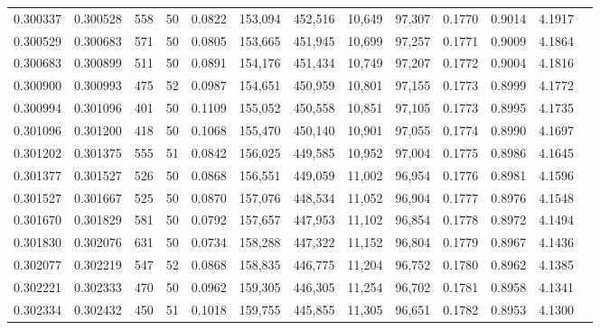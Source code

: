 \begin{tabular}{rrrrrrrrrrrrr}
0.300337 & 0.300528 &   558 &  50 &                                     0.0822 & 153,094 & 452,516 &  10,649 &  97,307 & 0.1770 & 0.9014 & 4.1917 \\
0.300529 & 0.300683 &   571 &  50 &                                     0.0805 & 153,665 & 451,945 &  10,699 &  97,257 & 0.1771 & 0.9009 & 4.1864 \\
0.300683 & 0.300899 &   511 &  50 &                                     0.0891 & 154,176 & 451,434 &  10,749 &  97,207 & 0.1772 & 0.9004 & 4.1816 \\
0.300900 & 0.300993 &   475 &  52 &                                     0.0987 & 154,651 & 450,959 &  10,801 &  97,155 & 0.1773 & 0.8999 & 4.1772 \\
0.300994 & 0.301096 &   401 &  50 &                                     0.1109 & 155,052 & 450,558 &  10,851 &  97,105 & 0.1773 & 0.8995 & 4.1735 \\
0.301096 & 0.301200 &   418 &  50 &                                     0.1068 & 155,470 & 450,140 &  10,901 &  97,055 & 0.1774 & 0.8990 & 4.1697 \\
0.301202 & 0.301375 &   555 &  51 &                                     0.0842 & 156,025 & 449,585 &  10,952 &  97,004 & 0.1775 & 0.8986 & 4.1645 \\
0.301377 & 0.301527 &   526 &  50 &                                     0.0868 & 156,551 & 449,059 &  11,002 &  96,954 & 0.1776 & 0.8981 & 4.1596 \\
0.301527 & 0.301667 &   525 &  50 &                                     0.0870 & 157,076 & 448,534 &  11,052 &  96,904 & 0.1777 & 0.8976 & 4.1548 \\
0.301670 & 0.301829 &   581 &  50 &                                     0.0792 & 157,657 & 447,953 &  11,102 &  96,854 & 0.1778 & 0.8972 & 4.1494 \\
0.301830 & 0.302076 &   631 &  50 &                                     0.0734 & 158,288 & 447,322 &  11,152 &  96,804 & 0.1779 & 0.8967 & 4.1436 \\
0.302077 & 0.302219 &   547 &  52 &                                     0.0868 & 158,835 & 446,775 &  11,204 &  96,752 & 0.1780 & 0.8962 & 4.1385 \\
0.302221 & 0.302333 &   470 &  50 &                                     0.0962 & 159,305 & 446,305 &  11,254 &  96,702 & 0.1781 & 0.8958 & 4.1341 \\
0.302334 & 0.302432 &   450 &  51 &                                     0.1018 & 159,755 & 445,855 &  11,305 &  96,651 & 0.1782 & 0.8953 & 4.1300 \\

\end{tabular}
